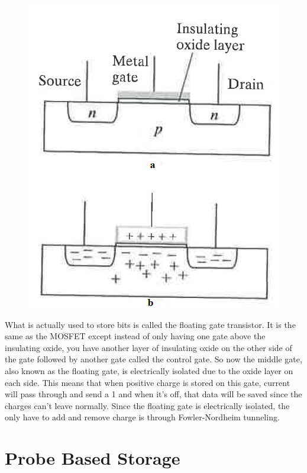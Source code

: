 \documentclass[ aip, 12pt]{revtex4-1} %
\begin{document}
\begin{figure}[H]
\centerline{\includegraphics[scale=.45]{mosfet.png}}
\caption{ }
\label{mosfet}
\end{figure}

What is actually used to store bits is called the floating gate transistor. It is the same as the MOSFET except instead of only having one gate above the insulating oxide, you have another layer of insulating oxide on the other side of the gate followed by another gate called the control gate. So now the middle gate, also known as the floating gate, is electrically isolated due to the oxide layer on each side. This means that when positive charge is stored on this gate, current will pass through and send a 1 and when it's off, that data will be saved since the charges can't leave normally. Since the floating gate is electrically isolated, the only have to add and remove charge is through Fowler-Nordheim tunneling. 


\section{Probe Based Storage}
\end{document}
